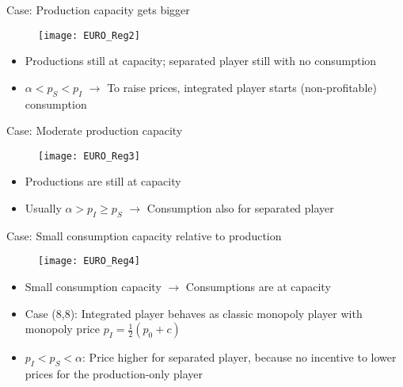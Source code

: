 \documentclass[aspectratio=169,t]{beamer}  %
\begin{document}
\begin{frame}{Case: Production capacity gets bigger}
\begin{figure}
    \texttt{[image: EURO\_Reg2]}
\end{figure}
\begin{itemize}
   \item Productions still at capacity; separated player still with no consumption
    \item $\alpha < p_S < p_I$ $\to$ To raise prices, integrated player starts (non-profitable) consumption
\end{itemize}
\end{frame}

\begin{frame}{Case: Moderate production capacity }
\begin{figure}
     \texttt{[image: EURO\_Reg3]}
\end{figure}
\begin{itemize}
  \item Productions are still at capacity  
   \item Usually $\alpha > p_I \geq p_S$ $\to$ Consumption also for separated player   
\end{itemize}
\end{frame}

\begin{frame}{Case: Small consumption capacity relative to production}
\begin{figure}
      \texttt{[image: EURO\_Reg4]}
\end{figure}
\begin{itemize}
    \item Small consumption capacity $\to$ Consumptions are at capacity
     \item Case (8,8): Integrated player behaves as classic monopoly player with monopoly price $p_I=\frac{1}{2}(p_0+c)$
     \item $p_I < p_S < \alpha$: Price higher for separated player, because no incentive to lower prices for the production-only player
\end{itemize}
\end{frame}
\end{document}
